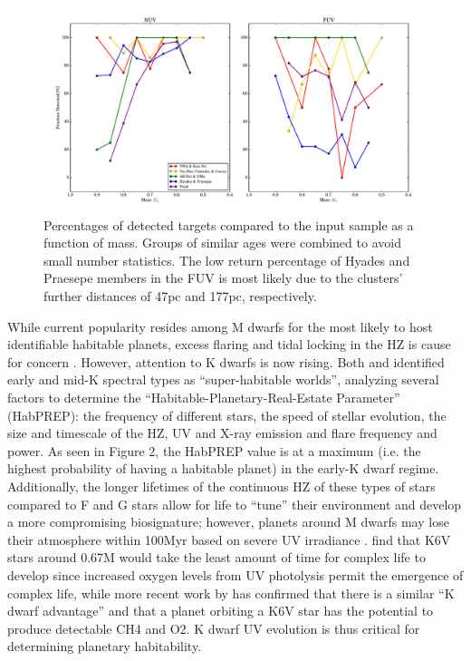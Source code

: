 \documentclass[twocolumn]{aastex62}
\begin{document}
\begin{figure}[t]
\centering
\includegraphics[width=0.8\linewidth]{massfractions.pdf}
\caption{Percentages of detected targets compared to the input sample as a function of mass. Groups of similar ages were combined to avoid small number statistics. The low return percentage of Hyades and Praesepe members in the FUV is most likely due to the clusters' further distances of 47pc and 177pc, respectively. \label{fig:mass_fractions}}
\end{figure}



While current popularity resides among M dwarfs for the most likely to host identifiable habitable planets, excess flaring and tidal locking in the HZ is cause for concern \citep[e.g.][]{Shields2016}. However, attention to K dwarfs is now rising. Both \citet{Heller2014} and \citet{Cuntz2016} identified early and mid-K spectral types as “super-habitable worlds”, analyzing several factors to determine the “Habitable-Planetary-Real-Estate Parameter” (HabPREP): the frequency of different stars, the speed of stellar evolution, the size and timescale of the HZ, UV and X-ray emission and flare frequency and power. As seen in Figure 2, the HabPREP value is at a maximum (i.e. the highest probability of having a habitable planet) in the early-K dwarf regime. Additionally, the longer lifetimes of the continuous HZ of these types of stars compared to F and G stars allow for life to “tune” their environment and develop a more compromising biosignature; however, planets around M dwarfs may lose their atmosphere within 100Myr based on severe UV irradiance \citep{Airapetian2017}. \citet{Lingam2017} find that K6V stars around 0.67M  would take the least amount of time for complex life to develop since increased oxygen levels from UV photolysis permit the emergence of complex life, while more recent work by \citet{Arney2017}
has confirmed that there is a similar “K dwarf advantage” and that a planet orbiting a K6V star has the potential to produce detectable CH4 and O2. K dwarf UV evolution is thus critical for determining planetary habitability.
\end{document}
